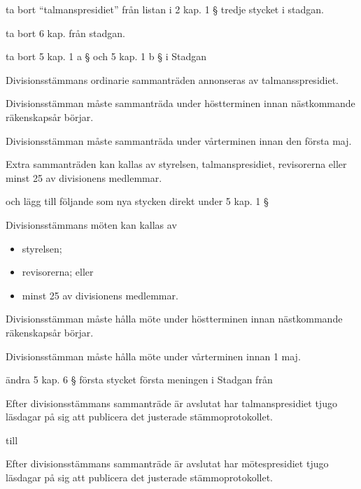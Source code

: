 \documentclass[protokoll]{dvd}
\begin{document}
\begin{attsatser}
	\item ta bort ``talmanspresidiet'' från listan i 2 kap. 1 § tredje stycket i stadgan.

	\item ta bort 6 kap. från stadgan.

	\item ta bort 5 kap. 1 a § och 5 kap. 1 b § i Stadgan

	\begin{displayquote}
		Divisionsstämmans ordinarie sammanträden annonseras av talmansspresidiet.

		Divisionsstämman måste sammanträda under höstterminen innan nästkommande räkenskapsår börjar.

		Divisionsstämman måste sammanträda under vårterminen innan den första maj.

		Extra sammanträden kan kallas av styrelsen, talmanspresidiet, revisorerna eller minst 25 av divisionens medlemmar.
	\end{displayquote}

	och lägg till följande som nya stycken direkt under 5 kap. 1 §

	\begin{displayquote}
		Divisionsstämmans möten kan kallas av

		\begin{itemize}
			\item styrelsen;
			\item revisorerna; eller
			\item minst 25 av divisionens medlemmar.
		\end{itemize}

		Divisionsstämman måste hålla möte under höstterminen innan nästkommande räkenskapsår börjar.

		Divisionsstämman måste hålla möte under vårterminen innan 1 maj.
	\end{displayquote}

	\item ändra 5 kap. 6 § första stycket första meningen i Stadgan från

	\begin{displayquote}
		Efter divisionsstämmans sammanträde är avslutat har talmanspresidiet tjugo läsdagar på sig att publicera det justerade stämmoprotokollet.
	\end{displayquote}

	till

	\begin{displayquote}
		Efter divisionsstämmans sammanträde är avslutat har mötespresidiet tjugo läsdagar på sig att publicera det justerade stämmoprotokollet.
	\end{displayquote}


\end{attsatser}
\end{document}

